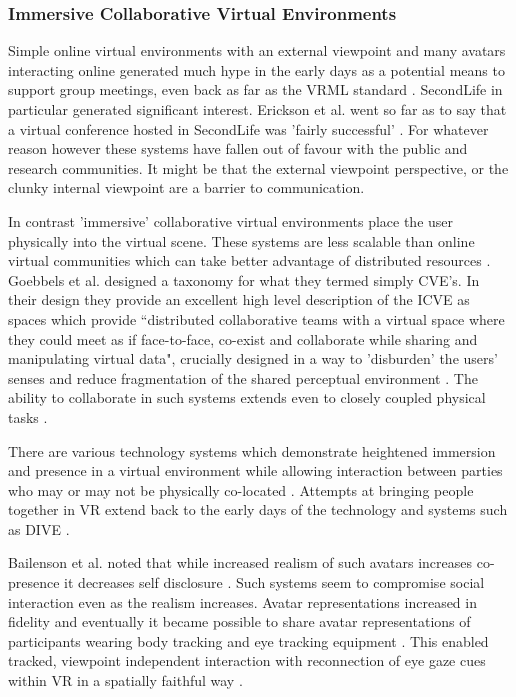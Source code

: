         \subsubsection{Immersive Collaborative Virtual Environments}
Simple online virtual environments with an external viewpoint and many avatars interacting online generated much hype in the early days as a potential means to support group meetings, even back as far as the VRML standard \cite{Ferscha1999}. SecondLife in particular generated significant interest. Erickson et al. went so far as to say that a virtual conference hosted in SecondLife was 'fairly successful' \cite{Erickson2011}. For whatever reason however these systems have fallen out of favour with the public and research communities. It might be that the external viewpoint perspective, or the clunky internal viewpoint are a barrier to communication. \par
In contrast 'immersive' collaborative virtual environments place the user physically into the virtual scene. These systems are less scalable than online virtual communities which can take better advantage of distributed resources \cite{Grimstead2005a, Benford1998}. Goebbels et al. designed a taxonomy for what they termed simply CVE's. In their design they provide an excellent high level description of the ICVE as spaces which provide ``distributed collaborative teams with a virtual space where they could meet as if face-to-face, co-exist and collaborate while sharing and manipulating virtual data", crucially designed in a way to 'disburden' the users' senses \cite{Goebbels2003} and reduce fragmentation of the shared perceptual environment \cite{Roberts2005}. The ability to collaborate in such systems extends even to closely coupled physical tasks \cite{Roberts2012}.\par
There are various technology systems which demonstrate heightened immersion and presence in a virtual environment while allowing interaction between parties who may or may not be physically co-located \cite{Murray2009a}. Attempts at bringing people together in VR extend back to the early days of the technology and systems such as DIVE \cite{Benford:1995hh}. \par
                        Bailenson et al. noted that while increased realism of such avatars increases co-presence it decreases self disclosure \cite{Bailenson2006}. Such systems seem to compromise social interaction even as the realism increases. Avatar representations increased in fidelity and eventually it became possible to share avatar representations of participants wearing body tracking \cite{Schreer2005} and eye tracking equipment \cite{Garau2001, Garau2003}. This enabled tracked, viewpoint independent interaction with reconnection of eye gaze cues within VR in a spatially faithful way \cite{Roberts2003, Murray2007, Steptoe2008, Steptoe2009, Steptoe2010b}.\par
